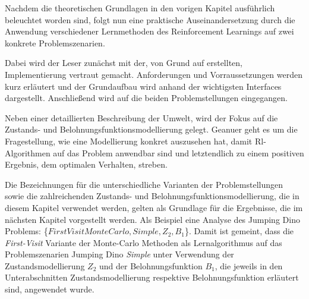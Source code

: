 Nachdem die theoretischen Grundlagen in den vorigen Kapitel ausführlich beleuchtet worden sind, folgt nun eine praktische Auseinandersetzung durch die Anwendung verschiedener Lernmethoden des Reinforcement Learnings auf zwei konkrete Problemszenarien. 
\par 
Dabei wird der Leser zunächst mit der, von Grund auf erstellten, Implementierung vertraut gemacht. Anforderungen und Vorraussetzungen werden kurz erläutert und der Grundaufbau wird anhand der wichtigsten Interfaces dargestellt. Anschließend wird auf die beiden Problemstellungen eingegangen. 
\par 
Neben einer detaillierten Beschreibung der Umwelt, wird der Fokus auf die Zustands- und Belohnungsfunktionsmodellierung gelegt. Geanuer geht es um die Fragestellung, wie eine Modellierung konkret auszusehen hat, damit Rl-Algorithmen auf das Problem anwendbar sind und letztendlich zu einem positiven Ergebnis, dem optimalen Verhalten, streben.
\par
Die Bezeichnungen für die unterschiedliche Varianten der Problemstellungen sowie die zahlreichenden Zustands- und Belohnungsfunktionsmodellierung, die in diesem Kapitel verwendet werden, gelten als Grundlage für die Ergebnisse, die im nächsten Kapitel vorgestellt werden. Als Beispiel eine Analyse des Jumping Dino Problems: \{$FirstVisitMonteCarlo,Simple, Z_2, B_1$\}. Damit ist gemeint, dass die \textit{First-Visit }Variante der Monte-Carlo Methoden als Lernalgorithmus auf das Problemszenarien Jumping Dino \textit{Simple} unter Verwendung der Zustandsmodellierung $Z_2$ und der Belohnungsfunktion $B_1$, die jeweils in den Unterabschnitten \glqq Zustandsmodellierung\grqq{} respektive \glqq Belohnungsfunktion\grqq{} erläutert sind, angewendet wurde.
